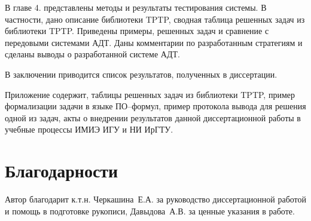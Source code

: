 В главе 4. представлены методы и результаты тестирования системы. В частности, дано описание библиотеки TPTP, сводная таблица решенных задач из библиотеки TPTP. Приведены примеры, решенных задач и сравнение с передовыми системами АДТ. Даны комментарии по разработанным стратегиям и сделаны выводы о разработанной системе АДТ. %

В заключении приводится список результатов, полученных в диссертации. %

Приложение содержит, таблицы решенных задач из библиотеки TPTP, пример формализации задачи в языке ПО--формул, пример протокола вывода для решения одной из задач, акты о внедрении результатов данной диссертационной работы в учебные процессы ИМИЭ ИГУ и НИ ИрГТУ.



\section*{Благодарности}
Автор благодарит к.т.н. Черкашина~Е.А. за руководство диссертационной работой и помощь в подготовке рукописи, Давыдова~А.В. за ценные указания в работе.


